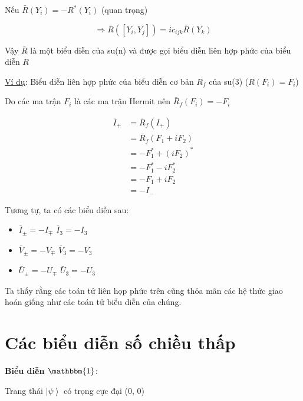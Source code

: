 \documentclass{report}
\begin{document}
\hspace*{0.5cm} Nếu \( \bar{R}(Y_{i}) = - R^{*}(Y_{i}) \) (quan trọng)

\[ \Rightarrow \bar{R}( \left[ Y_{i}, Y_{j} \right] ) = i c_{ijk} \bar{R}(Y_{k}) \]

Vậy \( \bar{R} \) là một biểu diễn của su(n) và được gọi biểu diễn liên hợp phức của biểu diễn \( R \)

\underline{Ví dụ}: Biểu diễn liên hợp phức của biểu diễn cơ bản \( R_{f} \) của su(3) (\( R(F_{i}) = F_{i} \))

Do các ma trận \( F_{i} \) là các ma trận Hermit nên \( \bar{R}_{f}(F_{i}) = - F_{i} \)

	\begin{align*}
		\bar{I}_{+} & = \bar{R}_{f}(I_{+}) \\
		& = \bar{R}_{f}(F_{1} + i F_{2}) \\
		& = - F_{1}^{*} + (i F_{2})^{*} \\
		& = - F_{1}^{*} - i F_{2}^{*} \\
		& = - F_{1} + i F_{2} \\
		& = - I_{-}
	\end{align*}
	
Tương tự, ta có các biểu diễn sau:

	\begin{itemize}
		\item \( \bar{I}_{\pm} = - I_{\mp} \) \hspace*{1cm} \( \bar{I}_{3} = - I_{3} \)
		\item \( \bar{V}_{\pm} = - V_{\mp} \) \hspace*{0.8cm} \( \bar{V}_{3} = - V_{3} \)
		\item \( \bar{U}_{\pm} = - U_{\mp} \) \hspace*{0.8cm} \( \bar{U}_{3} = - U_{3} \)
	\end{itemize}
	
Ta thấy rằng các toán tử liên họp phức trên cũng thỏa mãn các hệ thức giao hoán giống như các toán tử	biểu diễn của chúng.

\section{Các biểu diễn số chiều thấp}

\hspace*{0.4cm} \textbf{Biểu diễn \( \mathbbm{1} \)}:

Trang thái \( \left| \psi \right\rangle \) có trọng cực đại (0, 0) 
\end{document}
